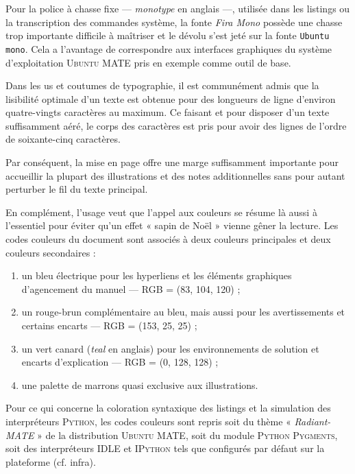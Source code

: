 Pour la police à chasse fixe --- \textit{monotype} en anglais ---, utilisée dans les listings ou la transcription des commandes système, la fonte \textit{Fira Mono} possède une chasse trop importante difficile à maîtriser et le dévolu s'est jeté sur la fonte \texttt{Ubuntu mono}. Cela a l'avantage de correspondre aux interfaces graphiques du système d'exploitation \textsc{Ubuntu MATE} pris en exemple comme outil de base.

Dans les us et coutumes de typographie, il est communément admis que la lisibilité optimale d'un texte est obtenue pour des longueurs de ligne d'environ quatre-vingts caractères au maximum. Ce faisant et pour disposer d'un texte suffisamment aéré, le corps des caractères est pris pour avoir des lignes de l'ordre de soixante-cinq caractères. 

Par conséquent, la mise en page offre une marge suffisamment importante pour accueillir la plupart des illustrations et des notes additionnelles sans pour autant perturber le fil du texte principal.

En complément, l'usage veut que l'appel aux couleurs se résume là aussi à l'essentiel pour éviter qu'un effet « sapin de Noël » vienne gêner la lecture. Les codes couleurs du document sont associés à deux couleurs principales et deux couleurs secondaires :
\begin{enumerate}
\item un \textcolor{firstcolor}{bleu électrique} pour les hyperliens et les éléments graphiques d'agencement du manuel --- RGB = (83, 104, 120) ;
\item un \textcolor{secondcolor}{rouge-brun} complémentaire au bleu, mais aussi pour les avertissements et certains encarts --- RGB = (153, 25, 25) ;
\item un \textcolor{thirdcolor}{vert canard} (\textit{teal} en anglais) pour les environnements de solution et encarts d'explication --- RGB = (0, 128, 128) ;
\item une \textcolor{fourthcolor}{palette de marrons} quasi exclusive aux illustrations.
\end{enumerate}

Pour ce qui concerne la coloration syntaxique des listings et la simulation des interpréteurs \textsc{Python}, les codes couleurs sont repris soit du thème « \textit{Radiant-MATE} » de la distribution \textsc{Ubuntu} MATE, soit du module \textsc{Python} \textsc{Pygments}, soit des interpréteurs IDLE et \textsc{IPython} tels que configurés par défaut sur la plateforme (cf. infra).


